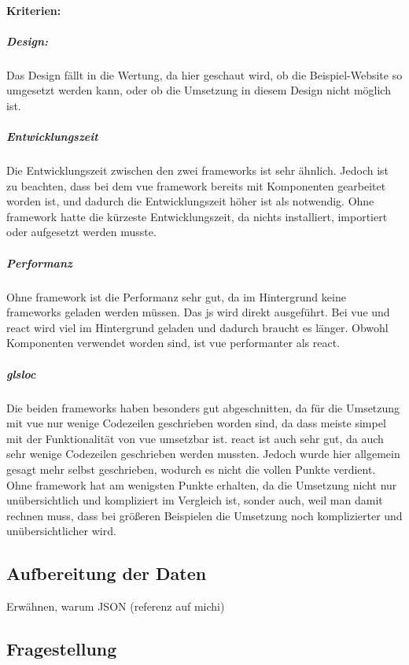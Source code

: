 \paragraph{Kriterien:}
\subparagraph{Design:}
Das Design fällt in die Wertung, da hier geschaut wird, ob die Beispiel-Website so umgesetzt werden kann, oder ob die Umsetzung in diesem Design nicht möglich ist.
\subparagraph{Entwicklungszeit}
Die Entwicklungszeit zwischen den zwei \Gls{framework}s ist sehr ähnlich. Jedoch ist zu beachten, dass bei dem \Gls{vue} \Gls{framework} bereits mit Komponenten gearbeitet worden ist, und dadurch die Entwicklungszeit höher ist als notwendig. Ohne \Gls{framework} hatte die kürzeste Entwicklungszeit, da nichts installiert, importiert oder aufgesetzt werden musste.
\subparagraph{Performanz}
Ohne \Gls{framework} ist die Performanz sehr gut, da im Hintergrund keine \Gls{framework}s geladen werden müssen. Das \Gls{js} wird direkt ausgeführt. Bei \Gls{vue} und \Gls{react} wird viel im Hintergrund geladen und dadurch braucht es länger. Obwohl Komponenten verwendet worden sind, ist \Gls{vue} performanter als \Gls{react}.
\subparagraph{gls{loc}}
Die beiden \Gls{framework}s haben besonders gut abgeschnitten, da für die Umsetzung mit \Gls{vue} nur wenige Codezeilen geschrieben worden sind, da dass meiste simpel mit der Funktionalität von \Gls{vue} umsetzbar ist. \Gls{react} ist auch sehr gut, da auch sehr wenige Codezeilen geschrieben werden mussten. Jedoch wurde hier allgemein gesagt mehr selbst geschrieben, wodurch es nicht die vollen Punkte verdient. Ohne \Gls{framework} hat am wenigsten Punkte erhalten, da die Umsetzung nicht nur unübersichtlich und kompliziert im Vergleich ist, sonder auch, weil man damit rechnen muss, dass bei größeren Beispielen die Umsetzung noch komplizierter und unübersichtlicher wird.
\subsection{Aufbereitung der Daten}
Erwähnen, warum JSON (referenz auf michi)
\subsection{Fragestellung}